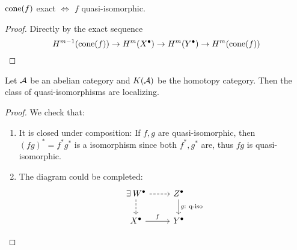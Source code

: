 \begin{coro}
  $\operatorname{cone}(f)$ exact $\iff$ $f$ quasi-isomorphic.

  \begin{proof}
    Directly by the exact sequence
    \[ H^{m-1}(\operatorname{cone}(f)) \to H^m(X^\bullet) \to H^m(Y^\bullet) \to H^{m}(\operatorname{cone}(f)) \]
  \end{proof}
\end{coro}

\begin{theorem}
  Let $\mathcal{A}$ be an abelian category and $K(\mathcal{A})$ be the homotopy category.
  Then the class of quasi-isomorphisms are localizing.

  \begin{proof}
    We check that:
    \begin{enumerate}
      \item It is closed under composition:
        If $f, g$ are quasi-isomorphic, then $(fg)^* = f^* g^*$ is
        a isomorphism since both $f^*, g^*$ are, thus $fg$ is quasi-isomorphic.
      \item The diagram could be completed:
        \[ \begin{tikzcd}
            \exists W^\bullet \ar[r, dashed] \ar[d, dashed] &
            Z^\bullet \ar[d, "g:\ \text{q-iso}"] \\
            X^\bullet \ar[r, "f"] & Y^\bullet
          \end{tikzcd} \]
    \end{enumerate}
  \end{proof}
\end{theorem}
